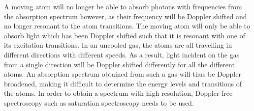 \documentclass[twocolumn]{article}
\begin{document}
\par A moving atom will no longer be able to absorb photons with frequencies from the absorption spectrum however, as their frequency will be Doppler shifted and no longer resonant to the atom transitions. The moving atom will only be able to absorb light which has been Doppler shifted such that it is resonant with one of its excitation transitions. In an uncooled gas, the atoms are all travelling in different directions with different speeds. As a result, light incident on the gas from a single direction will be Doppler shifted differently for all the different atoms. An absorption spectrum obtained from such a gas will thus be Doppler broadened, making it difficult to determine the energy levels and transitions of the atoms. In order to obtain a spectrum with high resolution, Doppler-free spectroscopy such as saturation spectroscopy needs to be used. 

\end{document}
